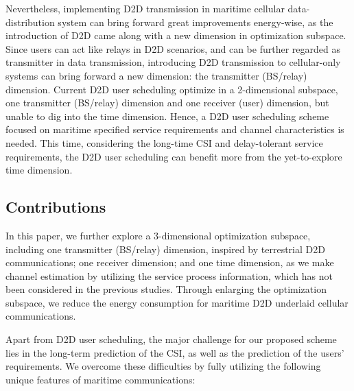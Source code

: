 \documentclass{ieeeaccess}
\begin{document}
Nevertheless, implementing D2D transmission in maritime cellular data-distribution system can bring forward great improvements energy-wise, as the introduction of D2D came along with a new dimension in optimization subspace. Since users can  act like relays in D2D scenarios, and can be further regarded as transmitter in data transmission, introducing D2D transmission to cellular-only systems can bring forward a new dimension: the transmitter (BS/relay) dimension. Current D2D user scheduling optimize in a 2-dimensional subspace, one transmitter (BS/relay) dimension and one receiver (user) dimension, but unable to dig into the time dimension. Hence, a D2D user scheduling scheme focused on maritime specified service requirements and channel characteristics is needed. This time, considering the long-time CSI and delay-tolerant service requirements, the D2D user scheduling can benefit more from the yet-to-explore time dimension. 



\subsection{Contributions}


In this paper, we further explore a 3-dimensional optimization subspace, including one transmitter (BS/relay) dimension, inspired by terrestrial D2D communications; one receiver dimension; and one time dimension, as we make channel estimation by utilizing the service process information, which has not been considered in the previous studies. Through enlarging the optimization subspace, we reduce the energy consumption for maritime D2D underlaid cellular communications. 

Apart from D2D user scheduling, the major challenge for our proposed scheme lies in the long-term prediction of the CSI, as well as the prediction of the users' requirements. We overcome these difficulties by fully utilizing the following unique features of maritime communications:
\end{document}
